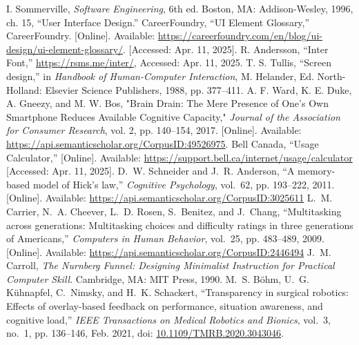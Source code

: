 \documentclass[conference]{IEEEtran}
\begin{document}
%  
% 


\begin{thebibliography}{00}


I. Sommerville, \emph{Software Engineering}, 6th ed. Boston, MA: Addison-Wesley, 1996, ch. 15, ``User Interface Design.''
CareerFoundry, ``UI Element Glossary,'' CareerFoundry. [Online]. Available: \url{https://careerfoundry.com/en/blog/ui-design/ui-element-glossary/}. [Accessed: Apr. 11, 2025].
R. Andersson, ``Inter Font,'' \url{https://rsms.me/inter/}, Accessed: Apr. 11, 2025.
T. S. Tullis, ``Screen design,'' in \emph{Handbook of Human-Computer Interaction}, M. Helander, Ed. North-Holland: Elsevier Science Publishers, 1988, pp. 377--411.
A. F. Ward, K. E. Duke, A. Gneezy, and M. W. Bos, "Brain Drain: The Mere Presence of One’s Own Smartphone Reduces Available Cognitive Capacity," \textit{Journal of the Association for Consumer Research}, vol. 2, pp. 140--154, 2017. [Online]. Available: \url{https://api.semanticscholar.org/CorpusID:49526975}.
Bell Canada, ``Usage Calculator,'' [Online]. Available: \url{https://support.bell.ca/internet/usage/calculator} [Accessed: Apr. 11, 2025].
D.~W. Schneider and J.~R. Anderson, ``A memory-based model of Hick’s law,'' \emph{Cognitive Psychology}, vol.~62, pp. 193--222, 2011. [Online]. Available: \url{https://api.semanticscholar.org/CorpusID:3025611}
L.~M. Carrier, N.~A. Cheever, L.~D. Rosen, S.~Benitez, and J.~Chang, ``Multitasking across generations: Multitasking choices and difficulty ratings in three generations of Americans,'' \emph{Computers in Human Behavior}, vol.~25, pp. 483--489, 2009. [Online]. Available: \url{https://api.semanticscholar.org/CorpusID:2446494}
J.~M. Carroll, \emph{The Nurnberg Funnel: Designing Minimalist Instruction for Practical Computer Skill}. Cambridge, MA: MIT Press, 1990.
M.~S. Böhm, U.~G. Kühnapfel, C.~Nimsky, and H.~K. Schackert, ``Transparency in surgical robotics: Effects of overlay-based feedback on performance, situation awareness, and cognitive load,'' \emph{IEEE Transactions on Medical Robotics and Bionics}, vol.~3, no.~1, pp. 136--146, Feb. 2021, doi: \href{https://doi.org/10.1109/TMRB.2020.3043046}{10.1109/TMRB.2020.3043046}.


\end{thebibliography}
\appendix
\end{document}
